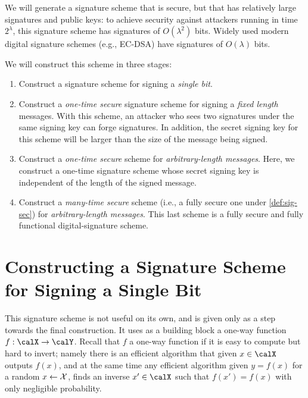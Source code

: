 We will generate a signature scheme that is secure, but that has relatively large
signatures and public keys: to achieve security against attackers running
in time $2^\lambda$, this signature scheme has signatures of $O(\lambda^2)$ bits.
Widely used modern digital signature schemes (e.g., EC-DSA) have signatures
of $O(\lambda)$ bits.

We will construct this scheme in three stages:

\begin{enumerate}
	\item Construct a signature scheme for signing a \emph{single bit}.  

        \item Construct a \emph{one-time secure} signature scheme for signing a \emph{fixed length} messages.
        With this scheme, an attacker who sees two signatures under the same signing key can forge signatures.
        In addition, the secret signing key for this scheme will be larger than the size of the message 
        being signed.
      \item Construct a \emph{one-time secure} scheme for \emph{arbitrary-length messages}.
        Here, we construct a one-time signature scheme whose secret signing key is independent of 
        the length of the signed message.

      \item Construct a \emph{many-time secure} scheme (i.e., a fully secure one under 
        \cref{def:sig-sec}) for \emph{arbitrary-length messages}.
        This last scheme is a fully secure and fully functional digital-signature scheme.
\end{enumerate}

\section{Constructing a Signature Scheme for Signing a Single Bit}

This signature scheme is not useful on its own, and is given only as a step towards the final construction.  It uses as a building block a one-way function $f:\calX\rightarrow\calY$.  Recall that $f$ a one-way function if it is easy to compute but hard to invert; namely there is an efficient algorithm that given $x\in\calX$ outputs $f(x)$, and at the same time any efficient algorithm given $y=f(x)$ for a random $x\leftarrow \cal X$, finds an inverse $x'\in\calX$ such that $f(x')=f(x)$ with only negligible probability.  


